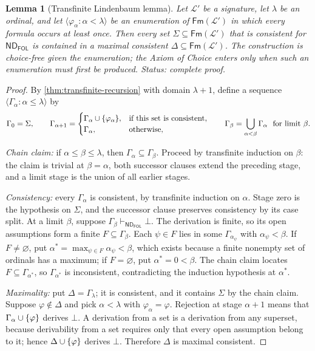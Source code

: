 \documentclass[11pt,oneside,openany]{book}
\theoremstyle{definition}
\theoremstyle{plain}
\newtheorem{lemma}[definition]{Lemma}
\theoremstyle{remark}
\DeclarePairedDelimiter{\set}{\lbrace}{\rbrace}
\newcommand{\Lang}{\mathcal{L}}
\newcommand{\Fm}{\mathsf{Fm}}
\newcommand{\derives}{\vdash}
\newcommand{\bottom}{\bot}
\newcommand{\ND}{\mathsf{ND}}
\newcommand{\FOL}{\mathsf{FOL}}
\begin{document}
\begin{lemma}[Transfinite Lindenbaum lemma]
\label{lem:transfinite-lindenbaum}
Let \(\Lang'\) be a signature, let \(\lambda\) be an ordinal, and let
\(\langle\varphi_\alpha:\alpha<\lambda\rangle\) be an enumeration of
\(\Fm(\Lang')\) in which every formula occurs at least once.  Then every
set \(\Sigma\subseteq\Fm(\Lang')\) that is consistent for
\(\ND_{\FOL}\) is contained in a maximal consistent
\(\Delta\subseteq\Fm(\Lang')\).  The construction is choice-free given the
enumeration; the Axiom of Choice enters only when such an enumeration must
first be produced.
\textit{Status: complete proof.}
\end{lemma}
\begin{proof}
By \cref{thm:transfinite-recursion} with domain \(\lambda+1\), define a
sequence \(\langle\Gamma_\alpha:\alpha\le\lambda\rangle\) by
\[
 \Gamma_0=\Sigma,\qquad
 \Gamma_{\alpha+1}=
 \begin{cases}
   \Gamma_\alpha\cup\set{\varphi_\alpha},&\text{if this set is
     consistent},\\
   \Gamma_\alpha,&\text{otherwise},
 \end{cases}
 \qquad
 \Gamma_\beta=\bigcup_{\alpha<\beta}\Gamma_\alpha
 \ \text{ for limit }\beta.
\]

\emph{Chain claim:} if \(\alpha\le\beta\le\lambda\), then
\(\Gamma_\alpha\subseteq\Gamma_\beta\).  Proceed by transfinite induction
on \(\beta\): the claim is trivial at \(\beta=\alpha\), both successor
clauses extend the preceding stage, and a limit stage is the union of all
earlier stages.

\emph{Consistency:} every \(\Gamma_\alpha\) is consistent, by transfinite
induction on \(\alpha\).  Stage zero is the hypothesis on \(\Sigma\), and
the successor clause preserves consistency by its case split.  At a limit
\(\beta\), suppose \(\Gamma_\beta\derives_{\ND_{\FOL}}\bottom\).  The
derivation is finite, so its open assumptions form a finite
\(F\subseteq\Gamma_\beta\).  Each \(\psi\in F\) lies in some
\(\Gamma_{\alpha_\psi}\) with \(\alpha_\psi<\beta\).  If
\(F\ne\varnothing\), put
\(\alpha^{*}=\max_{\psi\in F}\alpha_\psi<\beta\), which exists because a
finite nonempty set of ordinals has a maximum; if \(F=\varnothing\), put
\(\alpha^{*}=0<\beta\).  The chain claim locates
\(F\subseteq\Gamma_{\alpha^{*}}\), so \(\Gamma_{\alpha^{*}}\) is
inconsistent, contradicting the induction hypothesis at \(\alpha^{*}\).

\emph{Maximality:} put \(\Delta=\Gamma_\lambda\); it is consistent, and it
contains \(\Sigma\) by the chain claim.  Suppose \(\varphi\notin\Delta\)
and pick \(\alpha<\lambda\) with \(\varphi_\alpha=\varphi\).  Rejection at
stage \(\alpha+1\) means that \(\Gamma_\alpha\cup\set{\varphi}\) derives
\(\bottom\).  A derivation from a set is a derivation from any superset,
because derivability from a set requires only that every open assumption
belong to it; hence \(\Delta\cup\set{\varphi}\) derives \(\bottom\).
Therefore \(\Delta\) is maximal consistent.
\end{proof}
\end{document}
